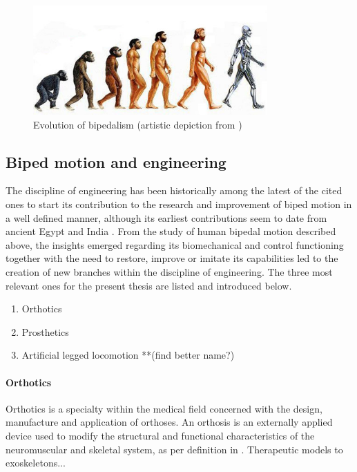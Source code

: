 \begin{figure}[h]
	\centering
	\includegraphics[width=0.8\textwidth]{figures/artificialhumans.jpg}
	\caption{Evolution of bipedalism (artistic depiction from \cite{human_evol_fig})}
	\label{fig:biped_evolution}
\end{figure}

\subsection{Biped motion and engineering} %
\label{sub:bipedalism_and_engineering}
The discipline of engineering has been historically among the latest of the cited ones to start its contribution to the research and improvement of biped motion in a well defined manner, although its earliest contributions seem to date from ancient Egypt and India \cite{prosthetics_history}.
From the study of human bipedal motion described above, the insights emerged regarding its biomechanical and control functioning together with the need to restore, improve or imitate its capabilities led to the creation of new branches within the discipline of engineering.
The three most relevant ones for the present thesis are listed and introduced below.

\begin{enumerate}
	\item Orthotics
	\item Prosthetics
	\item Artificial legged locomotion  **(find better name?)
\end{enumerate}

\paragraph{Orthotics} %
\label{par:orthotics}
Orthotics is a specialty within the medical field concerned with the design, manufacture and application of orthoses. An orthosis is an externally applied device used to modify the structural and functional characteristics of the neuromuscular and skeletal system, as per definition in \cite{ISO_orthosis}.
Therapeutic models to exoskeletons... 

